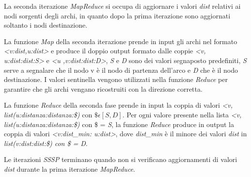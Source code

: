 \documentclass[LaM,binding=0.6cm]{sapthesis}
\begin{document}
\begin{minipage}{\linewidth}
		
\end{minipage}

\begin{minipage}{\linewidth}
		
\end{minipage}

La seconda iterazione \textit{MapReduce} si occupa di aggiornare i valori \textit{dist} relativi ai  nodi sorgenti degli archi, in quanto dopo la prima iterazione sono aggiornati soltanto i nodi destinazione. 

La funzione \textit{Map} della seconda  iterazione prende in input gli archi nel formato \textit{<v:dist,u:dist>} e produce il doppio output formato dalle coppie \textit{<v, u:dist:dist:S>} e \textit{<u ,v:dist:dist:D>}, \textit{S} e \textit{D} sono dei valori segnaposto predefiniti, \textit{S} serve a segnalare che il nodo v è il nodo di partenza dell'arco e \textit{D} che è il nodo destinazione. I valori sentinella vengono utilizzati nella funzione \textit{Reduce} per garantire che gli archi vengano ricostruiti con la direzione corretta.

La funzione \textit{Reduce} della seconda fase prende in input la coppia di valori \textit{<v, list(u:distanza:distanza:\$)} con \textit{$\$ \epsilon [S,D]$}. 
Per ogni valore presente nella lista  \textit{<v, list(u:distanza:distanza:\$)} con \$ = \textit{S}, la funzione \textit{Reduce} produce in output la coppia di valori \textit{<v:dist\_min: u:dist>}, dove \textit{dist\_min} è il minore dei valori \textit{dist} in \textit{list(v:dist:dist:\$) con \$ = \textit{D}}.

Le iterazioni \textit{SSSP} terminano quando non si verificano aggiornamenti di valori \textit{dist} durante la  prima iterazione \textit{MapReduce}.

\begin{minipage}{\linewidth}
		
\end{minipage}

\begin{minipage}{\linewidth}
		
\end{minipage}
\end{document}
